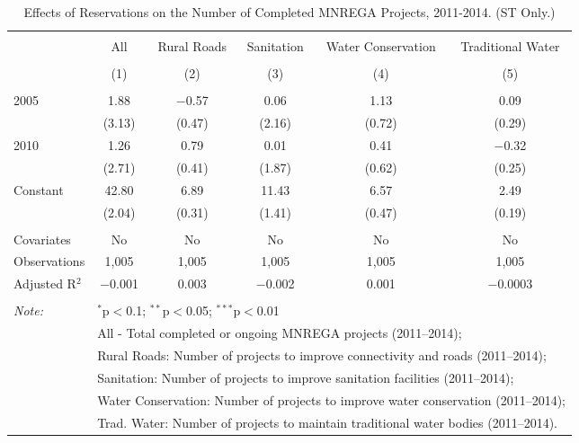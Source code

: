 
\begin{table}[!htbp] \centering 
  \caption{Effects of Reservations on the Number of Completed MNREGA Projects, 2011-2014. (ST Only.)} 
  \label{main_mnrega_phase_st} 
\scriptsize 
\begin{tabular}{@{\extracolsep{1pt}}lccccc} 
\\[-1.8ex]\hline 
\hline \\[-1.8ex] 
 & All & Rural Roads & Sanitation & Water Conservation & Traditional Water \\ 
\\[-1.8ex] & (1) & (2) & (3) & (4) & (5)\\ 
\hline \\[-1.8ex] 
 2005 & 1.88 & $-$0.57 & 0.06 & 1.13 & 0.09 \\ 
  & (3.13) & (0.47) & (2.16) & (0.72) & (0.29) \\ 
  2010 & 1.26 & 0.79 & 0.01 & 0.41 & $-$0.32 \\ 
  & (2.71) & (0.41) & (1.87) & (0.62) & (0.25) \\ 
  Constant & 42.80 & 6.89 & 11.43 & 6.57 & 2.49 \\ 
  & (2.04) & (0.31) & (1.41) & (0.47) & (0.19) \\ 
 \hline \\[-1.8ex] 
Covariates & No & No & No & No & No \\ 
Observations & 1,005 & 1,005 & 1,005 & 1,005 & 1,005 \\ 
Adjusted R$^{2}$ & $-$0.001 & 0.003 & $-$0.002 & 0.001 & $-$0.0003 \\ 
\hline 
\hline \\[-1.8ex] 
\textit{Note:}  & \multicolumn{5}{l}{$^{*}$p$<$0.1; $^{**}$p$<$0.05; $^{***}$p$<$0.01} \\ 
 & \multicolumn{5}{l}{All - Total completed or ongoing MNREGA projects (2011--2014);} \\ 
 & \multicolumn{5}{l}{Rural Roads: Number of projects to improve connectivity and roads (2011--2014);} \\ 
 & \multicolumn{5}{l}{Sanitation:  Number of projects to improve sanitation facilities  (2011--2014);} \\ 
 & \multicolumn{5}{l}{Water Conservation: Number of projects to improve water conservation (2011--2014);} \\ 
 & \multicolumn{5}{l}{Trad. Water: Number of projects to maintain traditional water bodies (2011--2014).} \\ 
\end{tabular} 
\end{table} 
